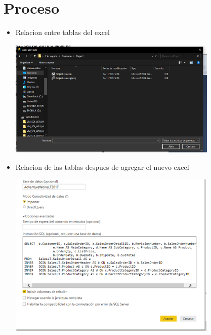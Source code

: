 \section{Proceso} 

\begin{itemize}
	\item Relacion entre tablas del excel
	\begin{center}
	\includegraphics[width=10cm]{./Imagenes/1} 
	\end{center}
\end{itemize} 

\begin{itemize}
	\item Relacion de las tablas despues de agregar el nuevo excel
	\begin{center}
	\includegraphics[width=10cm]{./Imagenes/2} 
	\end{center}
\end{itemize} 

